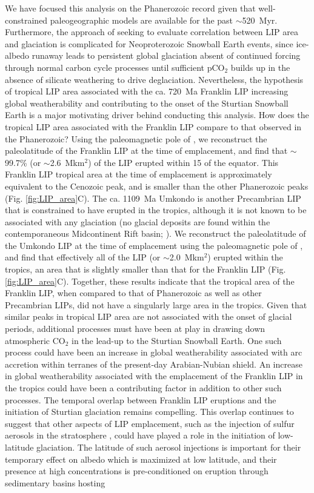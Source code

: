 \documentclass[11pt,letterpaper]{article}
\begin{document}
We have focused this analysis on the Phanerozoic record given that well-constrained paleogeographic models are available for the past $\sim$520~Myr. Furthermore, the approach of seeking to evaluate correlation between LIP area and glaciation is complicated for Neoproterozoic Snowball Earth events, since ice-albedo runaway leads to persistent global glaciation absent of continued forcing through normal carbon cycle processes until sufficient pCO$_2$ builds up in the absence of silicate weathering to drive deglaciation. Nevertheless, the hypothesis of tropical LIP area associated with the ca. 720~Ma Franklin LIP increasing global weatherability and contributing to the onset of the Sturtian Snowball Earth is a major motivating driver behind conducting this analysis. How does the tropical LIP area associated with the Franklin LIP compare to that observed in the Phanerozoic? Using the paleomagnetic pole of \citet{Denyszyn2009a}, we reconstruct the paleolatitude of the Franklin LIP at the time of emplacement, and find that $\sim$99.7\% (or $\sim$2.6~Mkm$^{2}$) of the LIP erupted within 15\textdegree\xspace of the equator. This Franklin LIP tropical area at the time of emplacement is approximately equivalent to the Cenozoic peak, and is smaller than the other Phanerozoic peaks (Fig. \ref{fig:LIP_area}C). The ca. 1109~Ma Umkondo is another Precambrian LIP that is constrained to have erupted in the tropics, although it is not known to be associated with any glaciation (no glacial deposits are found within the contemporaneous Midcontinent Rift basin; \citealp{Swanson-Hysell2018a}). We reconstruct the paleolatitude of the Umkondo LIP at the time of emplacement using the paleomagnetic pole of \citet{Swanson-Hysell2015b}, and find that effectively all of the LIP (or $\sim$2.0~Mkm$^{2}$) erupted within the tropics, an area that is slightly smaller than that for the Franklin LIP (Fig. \ref{fig:LIP_area}C). Together, these results indicate that the tropical area of the Franklin LIP, when compared to that of Phanerozoic as well as other Precambrian LIPs, did not have a singularly large area in the tropics. Given that similar peaks in tropical LIP area are not associated with the onset of glacial periods, additional processes must have been at play in drawing down atmospheric CO$_2$ in the lead-up to the Sturtian Snowball Earth. One such process could have been an increase in global weatherability associated with arc accretion within terranes of the present-day Arabian-Nubian shield. An increase in global weatherability associated with the emplacement of the Franklin LIP in the tropics could have been a contributing factor in addition to other such processes. The temporal overlap between Franklin LIP eruptions \citep{Denyszyn2009a} and the initiation of Sturtian glaciation \citep{Macdonald2010a, MacLennan2018a} remains compelling. This overlap continues to suggest that other aspects of LIP emplacement, such as the injection of sulfur aerosols in the stratosphere \citep{Macdonald2017a}, could have played a role in the initiation of low-latitude glaciation. The latitude of such aerosol injections is important for their temporary effect on albedo which is maximized at low latitude, and their presence at high concentrations is pre-conditioned on eruption through sedimentary basins hosting 
\end{document}
